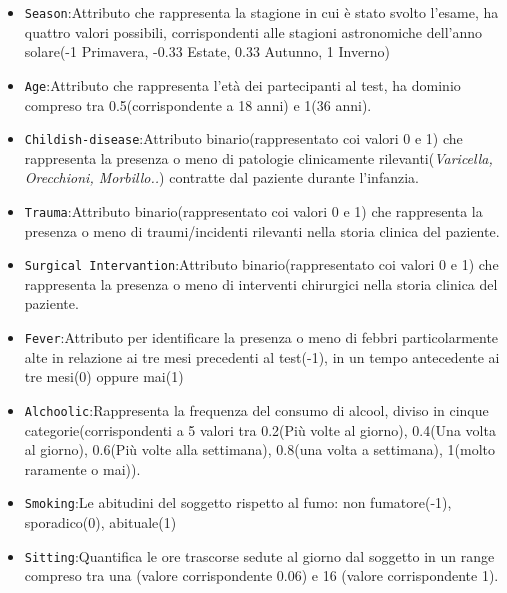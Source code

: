   \begin{itemize}
  	\item \texttt{Season}:Attributo che rappresenta la stagione in cui è stato svolto l'esame, ha quattro valori possibili, corrispondenti alle stagioni astronomiche dell'anno solare(-1 Primavera, -0.33 Estate, 0.33 Autunno, 1 Inverno)
  	
  	\item \texttt{Age}:Attributo che rappresenta l'età dei partecipanti al test, ha dominio compreso tra 0.5(corrispondente a 18 anni) e 1(36 anni).
  	
  	\item \texttt{Childish-disease}:Attributo binario(rappresentato coi valori 0 e 1) che rappresenta la presenza o meno di patologie clinicamente rilevanti(\textit{Varicella, Orecchioni, Morbillo..}) contratte dal paziente durante l'infanzia.
  
  	\item \texttt{Trauma}:Attributo binario(rappresentato coi valori 0 e 1) che rappresenta la presenza o meno di traumi/incidenti rilevanti nella storia clinica del paziente.	
  	
  	\item \texttt{Surgical Intervantion}:Attributo binario(rappresentato coi valori 0 e 1) che rappresenta la presenza o meno di interventi chirurgici nella storia clinica del paziente.
  	
  	\item \texttt{Fever}:Attributo per identificare la presenza o meno di febbri particolarmente alte in relazione ai tre mesi precedenti al test(-1), in un tempo antecedente ai tre mesi(0) oppure mai(1)
  	
  	\item \texttt{Alchoolic}:Rappresenta la frequenza del consumo di alcool, diviso in cinque categorie(corrispondenti a 5 valori tra 0.2(Più volte al giorno), 0.4(Una volta al giorno), 0.6(Più volte alla settimana), 0.8(una volta a settimana), 1(molto raramente o mai)).
  	
  	\item \texttt{Smoking}:Le abitudini del soggetto rispetto al fumo: non fumatore(-1), sporadico(0), abituale(1)
  	
  	\item \texttt{Sitting}:Quantifica le ore trascorse sedute al giorno dal soggetto in un range compreso tra una (valore corrispondente 0.06) e 16 (valore corrispondente 1).
  	
  \end{itemize} 

